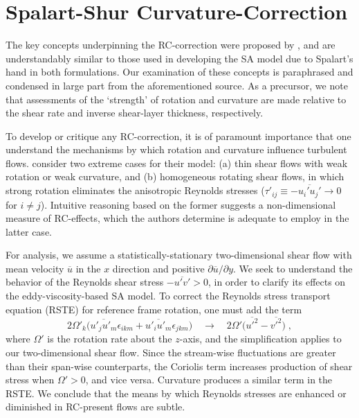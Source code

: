 \documentclass[11pt]{article}
\begin{document}
\section{Spalart-Shur Curvature-Correction} %

The key concepts underpinning the RC-correction were proposed by \citet{spalart1997}, and are understandably similar to those used in developing the SA model due to Spalart's hand in both formulations. Our examination of these concepts is paraphrased and condensed in large part from the aforementioned source. As a precursor, we note that assessments of the `strength' of rotation and curvature are made relative to the shear rate and inverse shear-layer thickness, respectively.

To develop or critique any RC-correction, it is of paramount importance that one understand the mechanisms by which rotation and curvature influence turbulent flows. \citet{spalart1997} consider two extreme cases for their model: (a) thin shear flows with weak rotation or weak curvature, and (b) homogeneous rotating shear flows, in which strong rotation eliminates the anisotropic Reynolds stresses ($\tau'_{ij} \equiv -\overline{u_i' u_j'} \rightarrow 0$ for $i \ne j$). Intuitive reasoning based on the former suggests a non-dimensional measure of RC-effects, which the authors determine is adequate to employ in the latter case.

For analysis, we assume a statistically-stationary two-dimensional shear flow with mean velocity $\overline{u}$ in the $x$ direction and positive $\partial \overline{u} / \partial y$. We seek to understand the behavior of the Reynolds shear stress $-\overline{u'v'} > 0$, in order to clarify its effects on the eddy-viscosity-based SA model. To correct the Reynolds stress transport equation (RSTE) for reference frame rotation, one must add the term
\begin{equation}
2 \Omega'_k \big( \overline{u'_j u'_m} \epsilon_{ikm} + \overline{u'_i u'_m} \epsilon_{jkm} \big)
\quad \rightarrow \quad
2 \Omega' \big( \overline{u'^2} - \overline{v'^2} \big)
\;,
\end{equation}
where $\Omega'$ is the rotation rate about the $z$-axis, and the simplification applies to our two-dimensional shear flow. Since the stream-wise fluctuations are greater than their span-wise counterparts, the Coriolis term increases production of shear stress when $\Omega' > 0$, and vice versa. Curvature produces a similar term in the RSTE. We conclude that the means by which Reynolds stresses are enhanced or diminished in RC-present flows are subtle.
\end{document}
